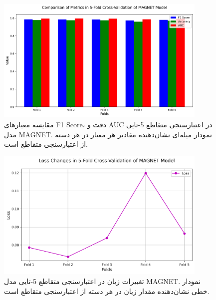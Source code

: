 \begin{figure}[h!]
    \centering
    \includegraphics[width=0.9\textwidth]{fig_cv_metrics}
    \caption{مقایسه معیارهای F1 Score، دقت و AUC در اعتبارسنجی متقاطع 5-تایی مدل MAGNET. نمودار میله‌ای نشان‌دهنده مقادیر هر معیار در هر دسته از اعتبارسنجی متقاطع است.}
    \label{fig:cv_metrics}
\end{figure}

\begin{figure}[h!]
    \centering
    \includegraphics[width=0.9\textwidth]{fig_cv_loss}
    \caption{تغییرات زیان در اعتبارسنجی متقاطع 5-تایی مدل MAGNET. نمودار خطی نشان‌دهنده مقدار زیان در هر دسته از اعتبارسنجی متقاطع است.}
    \label{fig:cv_loss}
\end{figure}

